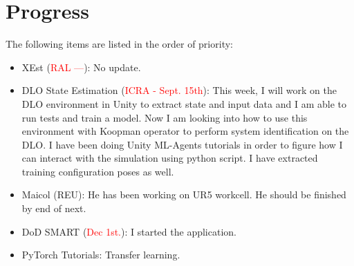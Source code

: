 \documentclass[11pt]{article}
\begin{document}
\section{Progress}
The following items are listed in the order of priority:
\begin{itemize}
    \item XEst (\textcolor{red}{RAL ---}): No update.


    \item DLO State Estimation (\textcolor{red}{ICRA - Sept. 15th}): This week,
    I will work on the DLO environment \cite{yu2022shape} in Unity to extract
    state and input data and I am able to run tests and
    train a model. Now I am
    looking into how to use this environment with Koopman operator to perform
    system identification on the DLO. I have been
    doing Unity ML-Agents tutorials in order to figure how I can interact with
    the simulation using python script. I have extracted training configuration
    poses as well.

    \item Maicol (REU): He has been working on UR5 workcell. He should be
    finished by end of next.
    \item DoD SMART (\textcolor{red}{Dec 1st.}): I started the application.

    \item PyTorch Tutorials: Transfer learning.

  \end{itemize}


\newpage

\newpage


\end{document}
